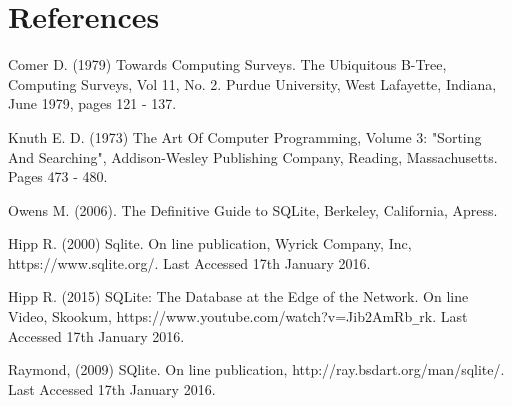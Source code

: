 \section{References}
\label{sec:references}

	

\begin{thebibliography}{0}

Comer D. (1979) Towards Computing Surveys. The Ubiquitous B-Tree, Computing Surveys, Vol 11, No. 2. Purdue University, West Lafayette, Indiana, June 1979, pages 121 - 137.

Knuth E. D. (1973) The Art Of Computer Programming, Volume 3: "Sorting And Searching", Addison-Wesley Publishing Company, Reading, Massachusetts. Pages 473 - 480.

Owens M. (2006). The Definitive Guide to SQLite, Berkeley, California, Apress. 

Hipp R. (2000) Sqlite. On line publication, Wyrick Company, Inc, https://www.sqlite.org/. Last Accessed 17th January 2016.

Hipp R. (2015) SQLite: The Database at the Edge of the Network. On line Video, Skookum, https://www.youtube.com/watch?v=Jib2AmRb\verb|_|rk. Last Accessed 17th January 2016.

Raymond, (2009) SQlite.  On line publication, http://ray.bsdart.org/man/sqlite/. Last Accessed 17th January 2016.

\end{thebibliography}